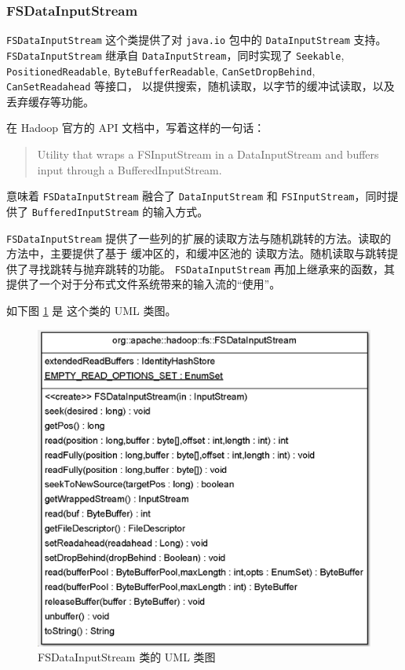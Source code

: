 
\subsubsection{FSDataInputStream}
\label{sec:uml:input:fsdatainputstream}

\lstinline{FSDataInputStream} 这个类提供了对 \lstinline|java.io| 包中的 \lstinline|DataInputStream| 支持。
\lstinline{FSDataInputStream} 继承自 \lstinline|DataInputStream|，同时实现了 \lstinline|Seekable|, \lstinline|PositionedReadable|, \lstinline|ByteBufferReadable|, \lstinline|CanSetDropBehind|, \lstinline|CanSetReadahead| 等接口，
以提供搜索，随机读取，以字节的缓冲试读取，以及丢弃缓存等功能。

在 Hadoop 官方的 API 文档中，写着这样的一句话：
\begin{quote}
    Utility that wraps a FSInputStream in a DataInputStream and buffers input through a BufferedInputStream.
\end{quote}
意味着 \lstinline|FSDataInputStream| 融合了 \lstinline|DataInputStream| 和 \lstinline|FSInputStream|，同时提供了
\lstinline|BufferedInputStream| 的输入方式。

\lstinline|FSDataInputStream| 提供了一些列的扩展的读取方法与随机跳转的方法。读取的方法中，主要提供了基于 缓冲区的，和缓冲区池的
读取方法。随机读取与跳转提供了寻找跳转与抛弃跳转的功能。
\lstinline|FSDataInputStream| 再加上继承来的函数，其提供了一个对于分布式文件系统带来的输入流的“使用”。

如下图 \ref{fig:fsdatainputstream} 是 这个类的 UML 类图。
\begin{figure}
\centering
\includegraphics[width=1\linewidth]{UML/inputstream/fsdatainputstream}
\caption{FSDataInputStream 类的 UML 类图}
\label{fig:fsdatainputstream}
\end{figure}


